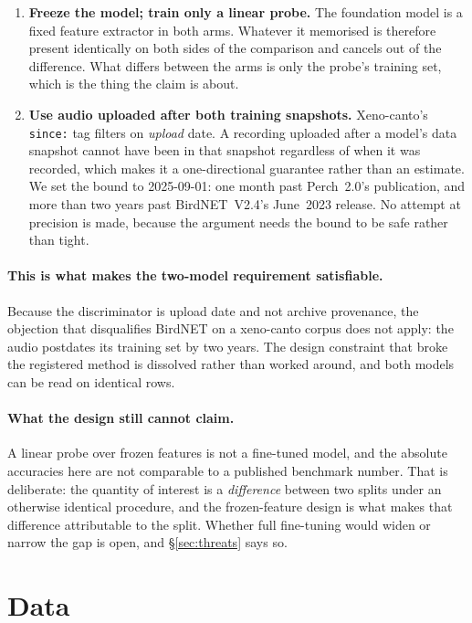 \documentclass[10pt,twocolumn,a4paper]{article}
\begin{document}
\begin{enumerate}
  \item \textbf{Freeze the model; train only a linear probe.} The foundation model is a fixed
    feature extractor in both arms. Whatever it memorised is therefore present identically on
    both sides of the comparison and cancels out of the difference. What differs between the
    arms is only the probe's training set, which is the thing the claim is about.
  \item \textbf{Use audio uploaded after both training snapshots.} Xeno-canto's
    \texttt{since:} tag filters on \emph{upload} date. A recording uploaded after a model's
    data snapshot cannot have been in that snapshot regardless of when it was recorded, which
    makes it a one-directional guarantee rather than an estimate. We set the bound to
    2025-09-01: one month past Perch~2.0's publication, and more than two years past
    BirdNET~V2.4's June~2023 release. No attempt at precision is made, because the argument
    needs the bound to be safe rather than tight.
\end{enumerate}

\paragraph{This is what makes the two-model requirement satisfiable.} Because the
discriminator is upload date and not archive provenance, the objection that disqualifies
BirdNET on a xeno-canto corpus does not apply: the audio postdates its training set by two
years. The design constraint that broke the registered method is dissolved rather than worked
around, and both models can be read on identical rows.

\paragraph{What the design still cannot claim.} A linear probe over frozen features is not a
fine-tuned model, and the absolute accuracies here are not comparable to a published
benchmark number. That is deliberate: the quantity of interest is a \emph{difference} between
two splits under an otherwise identical procedure, and the frozen-feature design is what makes
that difference attributable to the split. Whether full fine-tuning would widen or narrow the
gap is open, and \S\ref{sec:threats} says so.

\section{Data}
\label{sec:data}
\end{document}
